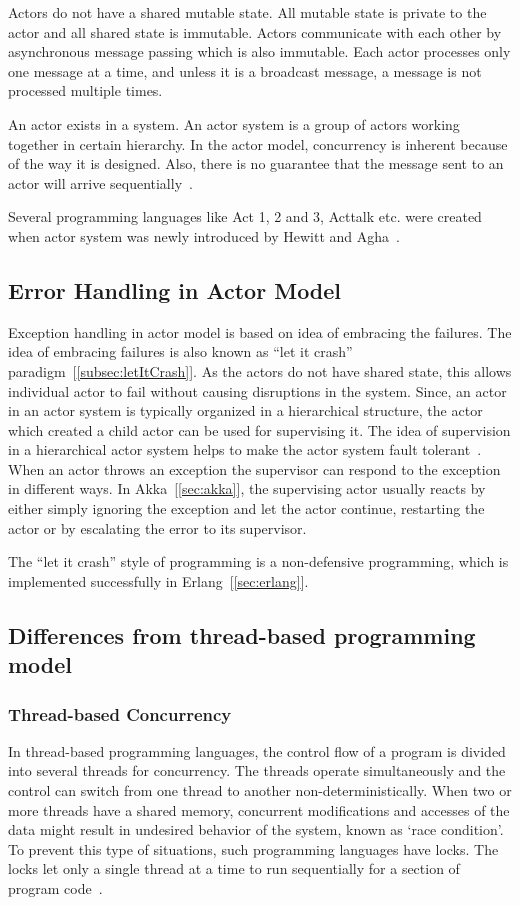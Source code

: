 Actors do not have a shared mutable state. All mutable state is private to the actor and all shared state is immutable. Actors communicate with each other by asynchronous message passing which is also immutable. Each actor processes only one message at a time, and unless it is a broadcast message, a message is not processed multiple times.

  An actor exists in a system. An actor system is a group of actors working together in certain hierarchy.
  In the actor model, concurrency is inherent because of the way it is designed. Also, there is no guarantee that the message sent to an actor will arrive sequentially~\cite{hewittVideo}.

  Several programming languages like Act 1, 2 and 3, Acttalk etc. were created when actor system was newly introduced by Hewitt and Agha~\cite{agha, hewitt}.

\subsection{Error Handling in Actor Model}
Exception handling in actor model is based on idea of embracing the failures. The idea of embracing failures is also known as “let it crash” paradigm~[\autoref{subsec:letItCrash}]. As the actors do not have shared state, this allows individual actor to fail without causing disruptions in the system. Since, an actor in an actor system is typically organized in a hierarchical structure, the actor which created a child actor can be used for supervising it. The idea of supervision in a hierarchical actor system helps to make the actor system fault tolerant~\cite{Erb2012}. When an actor throws an exception the supervisor can respond to the exception in different ways. In Akka~[\autoref{sec:akka}], the supervising actor usually reacts by either simply ignoring the exception and let the actor continue, restarting the actor or by escalating the error to its supervisor.

  The “let it crash” style of programming is a non-defensive programming, which is implemented successfully in Erlang~[\autoref{sec:erlang}].

\subsection{Differences from thread-based programming model}
\subsubsection{Thread-based Concurrency}
  \label{subsec:thread}
  In thread-based programming languages, the control flow of a program is divided into several threads for concurrency. The threads operate simultaneously and the control can switch from one thread to another non-deterministically. When two or more threads have a shared memory, concurrent modifications and accesses of the data might result in undesired behavior of the system, known as ‘race condition’. To prevent this type of situations, such programming languages have locks. The locks let only a single thread at a time to run sequentially for a section of program code~\cite{ambientTalk}.

